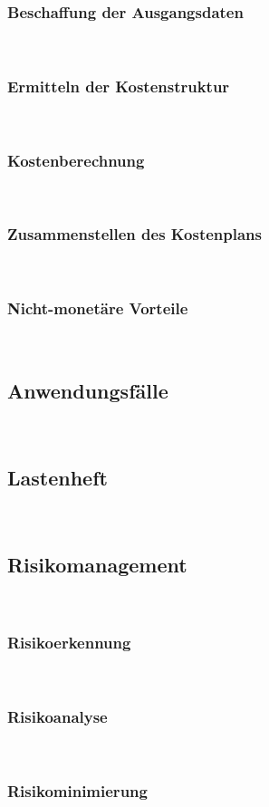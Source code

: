 \documentclass[11pt,toc=sectionentrywithoutdots, 
headheight=44pt, headings=optiontoheadandtoc, hyperfootnotes=false]{scrartcl}
\begin{document}
\subsubsection{Beschaffung der Ausgangsdaten}
\blindtext\

\subsubsection{Ermitteln der Kostenstruktur}
\blindtext\

\subsubsection{Kostenberechnung}
\blindtext\

\subsubsection{Zusammenstellen des Kostenplans}
\blindtext\

\subsubsection{Nicht-monetäre Vorteile}
\blindtext\

\subsection{Anwendungsfälle}
\blindtext\

\subsection{Lastenheft}
\blindtext\

\subsection{Risikomanagement}
\blindtext\

\subsubsection{Risikoerkennung}
\blindtext\

\subsubsection{Risikoanalyse}
\blindtext\

\subsubsection{Risikominimierung}
\blindtext\
\end{document}
